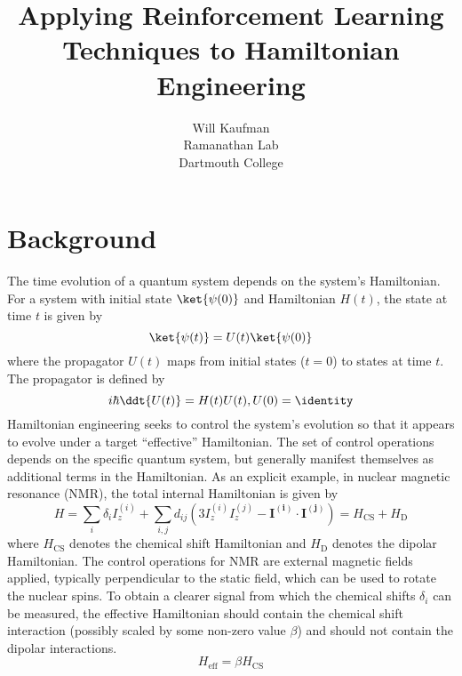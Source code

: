 \documentclass{article}
\title{Applying Reinforcement Learning Techniques to Hamiltonian Engineering}
\author{Will Kaufman \\ Ramanathan Lab \\ Dartmouth College}
\begin{document}
\maketitle

\section{Background}


The time evolution of a quantum system depends on the system's Hamiltonian. For a system with initial state $\ket{\psi(0)}$ and Hamiltonian $H(t)$, the state at time $t$ is given by
\[
\ket{\psi(t)} = U(t)\ket{\psi(0)}
\]
where the propagator $U(t)$ maps from initial states ($t=0$) to states at time $t$. The propagator is defined by
\begin{equation}
    i\hbar \ddt{U(t)} = H(t) U(t), U(0) = \identity
\end{equation}
Hamiltonian engineering seeks to control the system's evolution so that it appears to evolve under a target ``effective'' Hamiltonian. The set of control operations depends on the specific quantum system, but generally manifest themselves as additional terms in the Hamiltonian. As an explicit example, in nuclear magnetic resonance (NMR), the total internal Hamiltonian is given by
\begin{equation}\label{eq:Hint}
    H = \sum_i \delta_i I_z^{(i)} + \sum_{i,j} d_{ij} \left( 3I_z^{(i)}I_z^{(j)} - \mathbf{I^{(i)}} \cdot \mathbf{I^{(j)}} \right) = H_\text{CS} + H_\text{D}
\end{equation}
where $H_\text{CS}$ denotes the chemical shift Hamiltonian and $H_\text{D}$ denotes the dipolar Hamiltonian.
The control operations for NMR are external magnetic fields applied, typically perpendicular to the static field, which can be used to rotate the nuclear spins.
To obtain a clearer signal from which the chemical shifts $\delta_i$ can be measured, the effective Hamiltonian should contain the chemical shift interaction (possibly scaled by some non-zero value $\beta$) and should not contain the dipolar interactions.
\[
H_\text{eff} = \beta H_\text{CS}
\]
\end{document}
